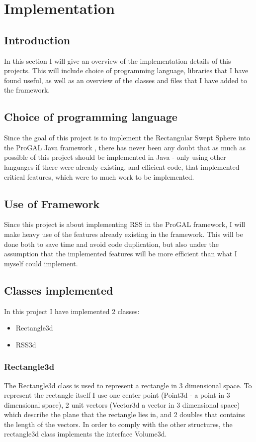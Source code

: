 
\section{Implementation}
\label{implementation}

\subsection{Introduction}
In this section I will give an overview of the implementation details of this projects. This will include choice of programming language, libraries that I have found useful, as well as an overview of the classes and files that I have added to the framework.

\subsection{Choice of programming language}
Since the goal of this project is to implement the Rectangular Swept Sphere into the ProGAL Java framework , there has never been any doubt that as much as possible of this project should be implemented in Java - only using other languages if there were already existing, and efficient code, that implemented critical features, which were to much work to be implemented.

\subsection{Use of Framework}
Since this project is about implementing RSS in the ProGAL framework, I will make heavy use of the features already existing in the framework. This will be done both to save time and avoid code duplication, but also under the assumption that the implemented features will be more efficient than what I myself could implement.

\subsection{Classes implemented}
In this project I have implemented 2 classes:
\begin{itemize}
\item Rectangle3d
\item RSS3d
\end{itemize}

\subsubsection{Rectangle3d}
\label{rectangle3d}
The Rectangle3d class is used to represent a rectangle in 3 dimensional space. To represent the rectangle itself I use one center point (Point3d - a point in 3 dimensional space), 2 unit vectors (Vector3d a vector in 3 dimensional space) which describe the plane that the rectangle lies in, and 2 doubles that contains the length of the vectors. In order to comply with the other structures, the rectangle3d class implements the interface Volume3d.

